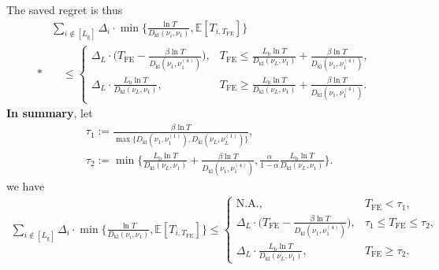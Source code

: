 \documentclass[twoside,11pt]{article}
\newcommand{\kl}{D_{\mathrm{kl}}}
\newcommand{\rmb}{\mathrm{b}}
\newcommand{\rmg}{\mathrm{g}}
\newcommand{\bbE}{\mathbb{E}}
\newcommand{\Tfe}{T_{\mathrm{FE}}}
\begin{document}
The saved regret is thus
\begin{align}
    &\sum_{i\notin [L_{\rmg}]}
    \Delta_i\cdot \min\bigg\{\frac{\ln T}{\kl(\nu_i,\nu_1)},\bbE[T_{i,\Tfe}]\bigg\}
    \\*
    &\quad\leq
    \begin{cases}
        \Delta_L\cdot\Big(
                \Tfe-\frac{\beta\ln T}{\kl(\nu_1,\nu_1^{(4)})}
            \Big), & \Tfe\leq \frac{L_{\rmb} \ln T}{\kl(\nu_L,\nu_1)}  +\frac{\beta\ln T}{\kl(\nu_1,\nu_1^{(4)})},
        \\
        \Delta_L \cdot  \frac{L_{\rmb}\ln T}{\kl(\nu_L,\nu_1)} ,& \Tfe\geq \frac{L_{\rmb}\ln T}{\kl(\nu_L,\nu_1)}+\frac{\beta\ln T}{\kl(\nu_1,\nu_1^{(4)})}.
    \end{cases}
\end{align}
\textbf{In summary},
let 
\begin{align}\label{equ:lwbd_tau_two_value}
    &\tau_1:=\frac{\beta\ln T}{\max\big\{\kl(\nu_1,\nu_1^{(1)}),\kl(\nu_L,\nu_L^{(1)})\big\}},
    \\
    &
    \tau_2:=\min\bigg\{\frac{L_{\rmb}\ln T}{\kl(\nu_L,\nu_1)}+\frac{\beta\ln T}{\kl(\nu_1,\nu_1^{(4)})},\frac{\alpha}{1-\alpha} \frac{L_{\rmb}\ln T}{\kl(\nu_L,\nu_1)}\bigg\}.
\end{align}
we have
\begin{align}
    \sum_{i\notin [L_{\rmg}]}
    \Delta_i\cdot \min\bigg\{\frac{\ln T}{\kl(\nu_i,\nu_1)},\bbE[T_{i,\Tfe}]\bigg\}
    \leq
    \begin{cases}
        \mbox{N.A.},& \Tfe < \tau_1,
        \\
        \Delta_L\cdot\Big(
                \Tfe-\frac{\beta\ln T}{\kl(\nu_1,\nu_1^{(4)})}
            \Big),& \tau_1\leq \Tfe\leq \tau_2,
        \\
        \Delta_L \cdot  \frac{L_{\rmb}\ln T}{\kl(\nu_L,\nu_1)},& \Tfe\geq \tau_2.
    \end{cases}
\end{align}
\end{document}
